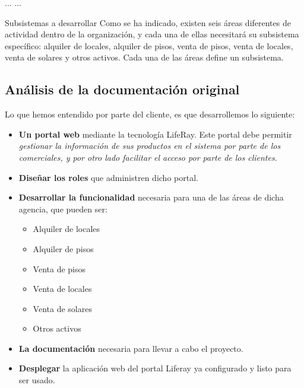 \begin{minipage}{30em}
...
...

Subsistemas a desarrollar
Como se ha indicado, existen seis áreas diferentes de actividad dentro de la
organización, y cada una de ellas necesitará su subsistema específico: alquiler de
locales, alquiler de pisos, venta de pisos, venta de locales, venta de solares y otros
activos. Cada una de las áreas define un subsistema.

\end{minipage}
\subsection{Análisis de la documentación original}
\par Lo que hemos entendido por parte del cliente, es que desarrollemos lo siguiente:
\begin{itemize}
	\item \textbf{Un portal web} mediante la tecnología LifeRay. Este portal debe permitir \textit{gestionar la información de sus productos en el sistema por parte de los
comerciales, y por otro lado facilitar el acceso por parte de los clientes}.
	\item \textbf{Diseñar los roles} que administren dicho portal.
	\item \textbf{Desarrollar la funcionalidad} necesaria para una de las áreas de dicha agencia, que pueden ser:
	\begin{itemize}
	 	\item Alquiler de locales
	 	\item Alquiler de pisos
	 	\item Venta de pisos
	 	\item Venta de locales
	 	\item Venta de solares
	 	\item Otros activos
	 \end{itemize}
	 \item \textbf{La documentación} necesaria para llevar a cabo el proyecto.
	 \item \textbf{Desplegar} la aplicación web del portal Liferay ya configurado y listo para ser usado.
\end{itemize}